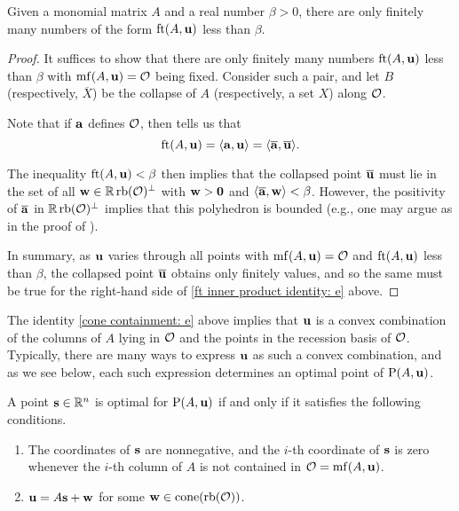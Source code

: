 \documentclass[11pt]{amsart}
\renewcommand{\!}[1]{{\color{red}\text{$\star$\,}#1\,$\star$}}
\newcommand{\ol}[1]{\overline{#1}}
\begin{document}
\begin{lemma}
\label{discreteness of F-thresholds: L}
Given a monomial matrix $A$ and a real number $\beta > 0 $, there are only finitely many numbers of the form $\operatorname{ft}(A, \mathbf{u})$ less than $\beta$.    
\end{lemma}

\begin{proof}   
It suffices to show that there are only finitely many numbers $\operatorname{ft}(A, \mathbf{u})$ less than $\beta$ with $\operatorname{mf}(A, \mathbf{u}) = \mathcal{O}$ being fixed.   Consider such a pair, and let $B$ (respectively, $\ol{X}$) be the collapse of $A$ (respectively,  a set $X$) along $\mathcal{O}$.

Note that if $\mathbf{a}$ defines $\mathcal{O}$, then  tells us that 
%
\begin{equation} 
\label{ft inner product identity: e}
\ft{A}{\vv{u}} = \iprod{\vv{a}}{\vv{u}} = \iprod{\ol{\vv{a}}}{\ol{\vv{u}}}. 
\end{equation}
% 

The inequality $\operatorname{ft}(A, \mathbf{u}) < \beta$ then implies that the collapsed point $\ol{\vv{u}}$ must lie in the set of all $\mathbf{w} \in \mathbb{R} \operatorname{rb}(\mathcal{O})^{\perp}$ with $\mathbf{w} > \mathbf{0}$ and $\iprod{\ol{\vv{a}}}{\vv{w}} < \beta$.  However, the positivity of $\ol{\vv{a}}$ in $\mathbb{R} \operatorname{rb}(\mathcal{O})^{\perp}$ implies that this polyhedron is bounded (e.g., one may argue as in the proof of ).  

In summary, as $\mathbf{u}$ varies through all points with  $\operatorname{mf}(A, \mathbf{u}) = \mathcal{O}$ and $\operatorname{ft}(A, \mathbf{u})$ less than $\beta$, the collapsed point $\ol{\vv{u}}$ obtains only finitely values, and so the same must be true for the right-hand side of \eqref{ft inner product identity: e} above.
\end{proof}


The identity \eqref{cone containment: e} above implies that 
$\mathbf{u}$ is a convex combination of the columns of $A$ lying in $\mathcal{O}$ and the points in the recession basis of $\mathcal{O}$.  Typically, there are many ways to express $\mathbf{u}$ as such a convex combination, and as we see below, each such expression determines an optimal point of $\mathrm{P}(A, \mathbf{u})$.

\begin{corollary}  
\label{opt set: C}
A point $\mathbf{s} \in \mathbb{R}^n$ is optimal for $\mathrm{P}(A, \mathbf{u})$ if and only if it satisfies the following conditions.
\begin{enumerate}
\item  \label{mc coords: e} The coordinates of $\mathbf{s}$ are nonnegative, and the $i$-th coordinate of $\mathbf{s}$ is zero whenever the $i$-th column of $A$ is not contained in $\mathcal{O} = \operatorname{mf}(A, \mathbf{u})$.
\item  \label{mc decomposition: e} $\mathbf{u} = A \mathbf{s} + \mathbf{w}$ for some $\mathbf{w} \in  \operatorname{cone}(\operatorname{rb}(\mathcal{O}))$.   
\end{enumerate}
\end{corollary}
\end{document}
